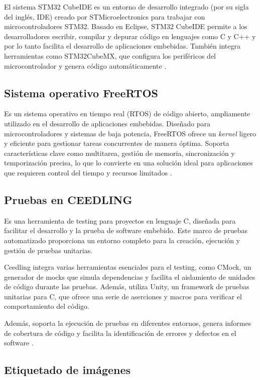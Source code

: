 El sistema STM32 CubeIDE es un entorno de desarrollo integrado (por su sigla del inglés, IDE) creado por STMicroelectronics para trabajar con microcontroladores STM32. Basado en Eclipse, STM32 CubeIDE permite a los desarrolladores escribir, compilar y depurar código en lenguajes como C y C++ y por lo tanto facilita el desarrollo de aplicaciones embebidas. También integra herramientas como STM32CubeMX, que configura los periféricos del microcontrolador y genera código automáticamente \citep{WEBSITE:stm32}.

\subsection{Sistema operativo FreeRTOS}
\label{subsec:FreeRTOS}

Es un sistema operativo en tiempo real (RTOS) de código abierto, ampliamente utilizado en el desarrollo de aplicaciones embebidas. Diseñado para microcontroladores y sistemas de baja potencia, FreeRTOS ofrece un \textit{kernel} ligero y eficiente para gestionar tareas concurrentes de manera óptima. Soporta características clave como multitarea, gestión de memoria, sincronización y temporización precisa, lo que lo convierte en una solución ideal para aplicaciones que requieren control del tiempo y recursos limitados \citep{WEBSITE:freertos}.

\subsection{Pruebas en CEEDLING}
\label{subsec:CEEDLING}

Es una herramienta de testing para proyectos en lenguaje C, diseñada para facilitar el desarrollo y la prueba de software embebido. Este marco de pruebas automatizado proporciona un entorno completo para la creación, ejecución y gestión de pruebas unitarias.

Ceedling integra varias herramientas esenciales para el testing, como CMock, un generador de mocks que simula dependencias y facilita el aislamiento de unidades de código durante las pruebas. Además, utiliza Unity, un framework de pruebas unitarias para C, que ofrece una serie de aserciones y macros para verificar el comportamiento del código.

Además, soporta la ejecución de pruebas en diferentes entornos, genera informes de cobertura de código y facilita la identificación de errores y defectos en el software \citep{WEBSITE:CEEDLING}.

\subsection{Etiquetado de imágenes}
\label{subsec:etiquetado}

